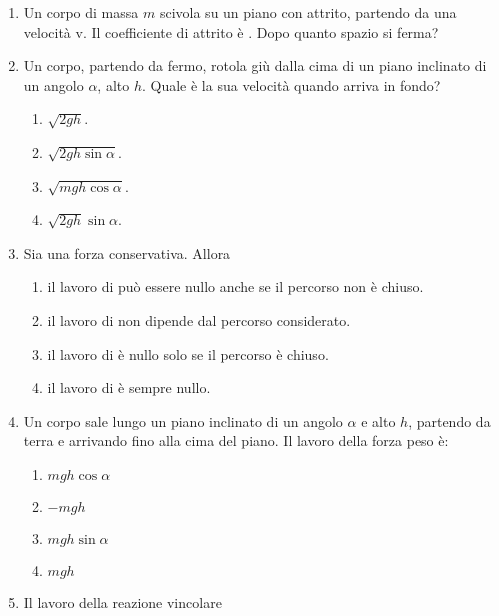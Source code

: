 \documentclass{article}
\begin{document}
\begin{enumerate}
  \item Un corpo di massa $m$ scivola su un piano con attrito, partendo da una velocità v. Il coefficiente di attrito è \mu. Dopo quanto spazio si ferma?
  \begin{enumerate}[label=\Alph*.]
    \item $\frac{1}{2}v^2+\mu g$.
    \item $\frac{2v^2}{g\mu}}$.
    \item $\frac{v^2}{2g\mu}}$.
    \item $\frac{1}{2}v^2-\mu g$.
  \end{enumerate}
  \item Un corpo, partendo da fermo, rotola giù dalla cima di un piano inclinato di un angolo $\alpha$, alto $h$. Quale è la sua velocità quando arriva in fondo?
  \begin{enumerate}[label=\Alph*.]
    \item $\sqrt{2gh}$.
    \item $\sqrt{2gh\sin\alpha}$.
    \item $\sqrt{mgh\cos\alpha}$.
    \item $\sqrt{2gh}\sin\alpha$.
  \end{enumerate}
  \item Sia  una forza conservativa. Allora
  \begin{enumerate}[label=\Alph*.]
    \item il lavoro di  può essere nullo anche se il percorso non è chiuso.
    \item il lavoro di  non dipende dal percorso considerato.
    \item il lavoro di  è nullo solo se il percorso è chiuso.
    \item il lavoro di  è sempre nullo.
  \end{enumerate}
  \item Un corpo sale lungo un piano inclinato di un angolo $\alpha$ e alto $h$, partendo da terra e arrivando fino alla cima del piano. Il lavoro della forza peso è:
  \begin{enumerate}[label=\Alph*.]
    \item $mgh\cos\alpha$
    \item $-mgh$
    \item $mgh\sin\alpha$
    \item $mgh$
  \end{enumerate}
  \item Il lavoro della reazione vincolare

\end{enumerate}
\end{document}
